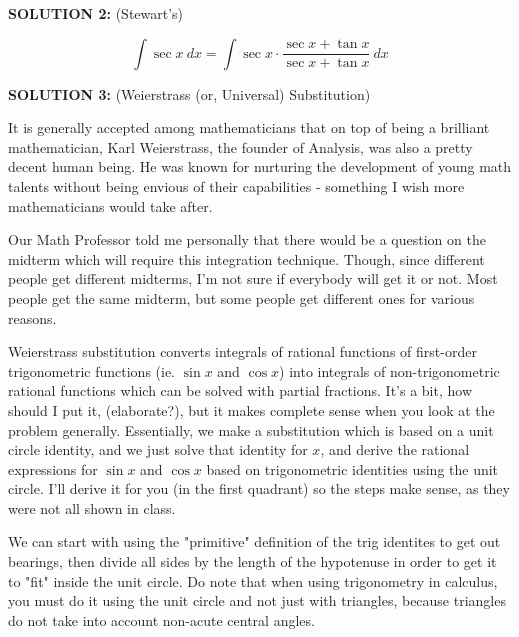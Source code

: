\documentclass{article}
\begin{document}
\newpage

{\bf{}SOLUTION 2:} (Stewart's)

\[\int\sec x\ dx=\int\sec x\cdot\frac{\sec x+\tan x}{\sec x+\tan x}\ dx\]

\vspace{10pt}

{\bf{}SOLUTION 3:} (Weierstrass (or, Universal) Substitution)

\vspace{10pt}

It is generally accepted among mathematicians that on top of being a brilliant mathematician, Karl Weierstrass, the founder of Analysis, was also a pretty decent human being. He was known for nurturing the development of young math talents without being envious of their capabilities - something I wish more mathematicians would take after. 

\vspace{10pt}

Our Math Professor told me personally that there would be a question on the midterm which will require this integration technique. Though, since different people get different midterms, I'm not sure if everybody will get it or not. Most people get the same midterm, but some people get different ones for various reasons.

\vspace{10pt}

Weierstrass substitution converts integrals of rational functions of first-order trigonometric functions (ie. $\sin x$ and $\cos x$) into integrals of non-trigonometric rational functions which can be solved with partial fractions. It's a bit, how should I put it, (elaborate?), but it makes complete sense when you look at the problem generally. Essentially, we make a substitution which is based on a unit circle identity, and we just solve that identity for $x$, and derive the rational expressions for $\sin x$ and $\cos x$ based on trigonometric identities using the unit circle. I'll derive it for you (in the first quadrant) so the steps make sense, as they were not all shown in class.

\vspace{10pt}

We can start with using the "primitive" definition of the trig identites to get out bearings, then divide all sides by the length of the hypotenuse in order to get it to "fit" inside the unit circle. Do note that when using trigonometry in calculus, you must do it using the unit circle and not just with triangles, because triangles do not take into account non-acute central angles.
\end{document}
